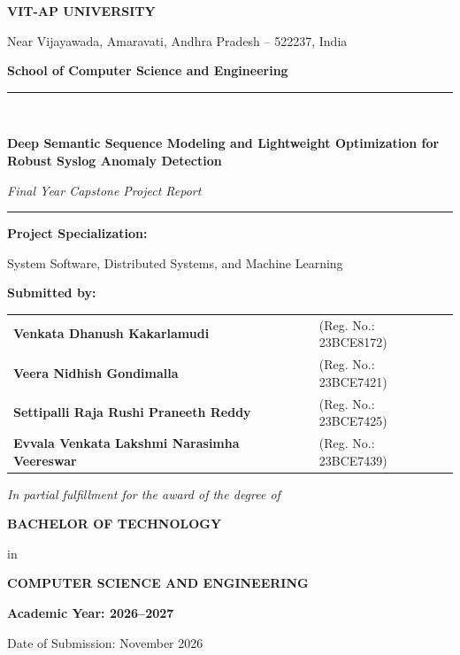 \begin{titlepage}
    \centering
    \vspace*{0.5cm}
    
    {\Large\bfseries VIT-AP UNIVERSITY\par}
    {\large Near Vijayawada, Amaravati, Andhra Pradesh -- 522237, India\par}
    {\large\bfseries School of Computer Science and Engineering\par}
    
    \vspace{1.5cm}
    
    \begin{center}
        \rule{0.8\textwidth}{1.2pt}\\[0.4cm]
        {\LARGE\bfseries Deep Semantic Sequence Modeling and Lightweight Optimization for Robust Syslog Anomaly Detection\par}
        \vspace{0.2cm}
        {\large\itshape Final Year Capstone Project Report\par}
        \rule{0.8\textwidth}{1.2pt}
    \end{center}
    
    \vspace{0.8cm}
    
    {\small\textbf{Project Specialization:}\par}
    {\normalsize System Software, Distributed Systems, and Machine Learning\par}
    
    \vspace{1.5cm}
    
    {\large\bfseries Submitted by:\par}
    \vspace{0.4cm}
    \begin{tabular}{ll}
        \textbf{Venkata Dhanush Kakarlamudi} & (Reg. No.: 23BCE8172) \\
        \textbf{Veera Nidhish Gondimalla} & (Reg. No.: 23BCE7421) \\
        \textbf{Settipalli Raja Rushi Praneeth Reddy} & (Reg. No.: 23BCE7425) \\
        \textbf{Evvala Venkata Lakshmi Narasimha Veereswar} & (Reg. No.: 23BCE7439) \\
    \end{tabular}
    
    \vspace{1.5cm}
    
    {\normalsize\itshape In partial fulfillment for the award of the degree of\par}
    \vspace{0.2cm}
    {\large\bfseries BACHELOR OF TECHNOLOGY\par}
    {\normalsize in\par}
    {\large\bfseries COMPUTER SCIENCE AND ENGINEERING\par}
    
    \vfill
    
    {\large\bfseries Academic Year: 2026--2027\par}
    {\normalsize Date of Submission: November 2026\par}
\end{titlepage}

